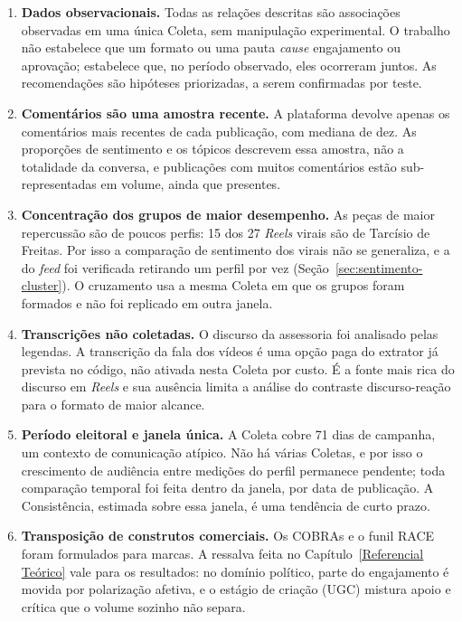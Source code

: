 \begin{enumerate}
    \item \textbf{Dados observacionais.} Todas as relações descritas são associações observadas em uma única Coleta, sem manipulação experimental. O trabalho não estabelece que um formato ou uma pauta \emph{cause} engajamento ou aprovação; estabelece que, no período observado, eles ocorreram juntos. As recomendações são hipóteses priorizadas, a serem confirmadas por teste.
    \item \textbf{Comentários são uma amostra recente.} A plataforma devolve apenas os comentários mais recentes de cada publicação, com mediana de dez. As proporções de sentimento e os tópicos descrevem essa amostra, não a totalidade da conversa, e publicações com muitos comentários estão sub-representadas em volume, ainda que presentes.
    \item \textbf{Concentração dos grupos de maior desempenho.} As peças de maior repercussão são de poucos perfis: 15 dos 27 \emph{Reels} virais são de Tarcísio de Freitas. Por isso a comparação de sentimento dos virais não se generaliza, e a do \emph{feed} foi verificada retirando um perfil por vez (Seção~\ref{sec:sentimento-cluster}). O cruzamento usa a mesma Coleta em que os grupos foram formados e não foi replicado em outra janela.
    \item \textbf{Transcrições não coletadas.} O discurso da assessoria foi analisado pelas legendas. A transcrição da fala dos vídeos é uma opção paga do extrator já prevista no código, não ativada nesta Coleta por custo. É a fonte mais rica do discurso em \emph{Reels} e sua ausência limita a análise do contraste discurso-reação para o formato de maior alcance.
    \item \textbf{Período eleitoral e janela única.} A Coleta cobre 71 dias de campanha, um contexto de comunicação atípico. Não há várias Coletas, e por isso o crescimento de audiência entre medições do perfil permanece pendente; toda comparação temporal foi feita dentro da janela, por data de publicação. A Consistência, estimada sobre essa janela, é uma tendência de curto prazo.
    \item \textbf{Transposição de construtos comerciais.} Os COBRAs e o funil RACE foram formulados para marcas. A ressalva feita no Capítulo~\ref{Referencial Teórico} vale para os resultados: no domínio político, parte do engajamento é movida por polarização afetiva, e o estágio de criação (UGC) mistura apoio e crítica que o volume sozinho não separa.

\end{enumerate}
